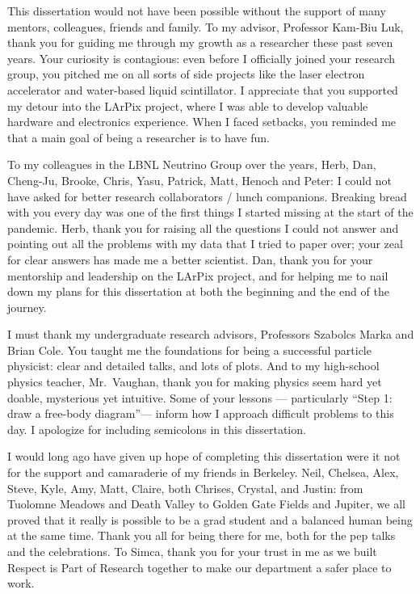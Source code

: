 \begin{acknowledgements}


    This dissertation would not have been possible
    without the support of many mentors, colleagues, friends and family.
    To my advisor, Professor Kam-Biu Luk,
    thank you for guiding me through my growth as a researcher these past seven years.
    Your curiosity is contagious:
    even before I officially joined your research group,
    you pitched me on all sorts of side projects
    like the laser electron accelerator
    and water-based liquid scintillator.
    I appreciate that you supported my detour into the LArPix project,
    where I was able to develop valuable hardware and electronics experience.
    When I faced setbacks, you reminded me that
    a main goal of being a researcher is to have fun.

    To my colleagues in the LBNL Neutrino Group over the years,
    Herb, Dan, Cheng-Ju, Brooke, Chris, Yasu, Patrick, Matt, Henoch and Peter:
    I could not have asked for better research collaborators / lunch companions.
    Breaking bread with you every day was one of the first things I started missing
    at the start of the pandemic.
    Herb, thank you for raising all the questions I could not answer
    and pointing out all the problems with my data that I tried to paper over;
    your zeal for clear answers has made me a better scientist.
    Dan, thank you for your mentorship and leadership on the LArPix project,
    and for helping me to nail down my plans for this dissertation
    at both the beginning and the end of the journey.

    I must thank my undergraduate research advisors,
    Professors Szabolcs Marka and Brian Cole.
    You taught me the foundations for being a successful particle physicist:
    clear and detailed talks, and lots of plots.
    And to my high-school physics teacher, Mr.~Vaughan,
    thank you for making physics seem hard yet doable,
    mysterious yet intuitive.
    Some of your lessons --- particularly ``Step 1: draw a free-body diagram''---
    inform how I approach difficult problems to this day.
    I apologize for including semicolons in this dissertation.

    I would long ago have given up hope of completing this dissertation
    were it not for the support and camaraderie of my friends in Berkeley.
    Neil, Chelsea, Alex, Steve, Kyle, Amy, Matt, Claire, both Chrises, Crystal,
    and Justin:
    from Tuolomne Meadows and Death Valley to Golden Gate Fields and Jupiter,
    we all proved that it really is possible to be a grad student
    and a balanced human being at the same time.
    Thank you all for being there for me, both for the pep talks
    and the celebrations.
    To Simca, thank you for your trust in me as we built
    Respect is Part of Research together to make our department
    a safer place to work.


\end{acknowledgements}
